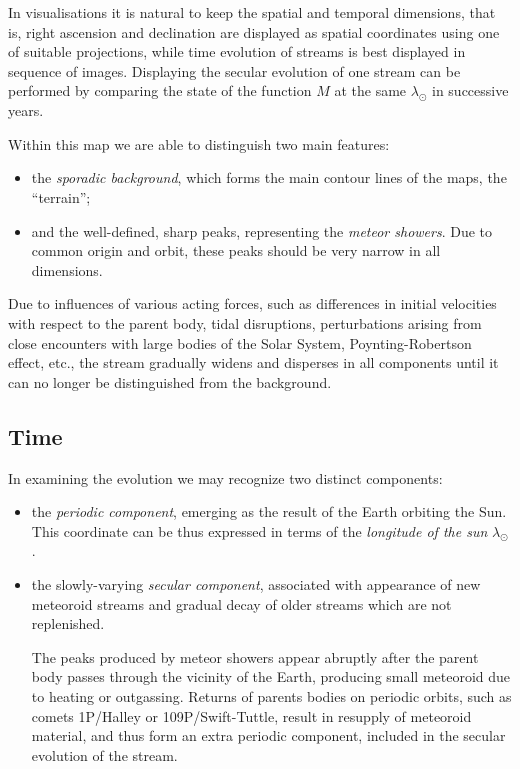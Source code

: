     In visualisations it is natural to keep the spatial and temporal dimensions, that is, right ascension and declination are
    displayed as spatial coordinates using one of suitable projections, while time evolution of streams is best displayed
    in sequence of images.
    Displaying the secular evolution of one stream can be performed by comparing the state of the function $M$ at
    the same $\lambda_\odot$ in successive years.

    \citep{balaz+2020}

    Within this map we are able to distinguish two main features:
    \begin{itemize}
        \item the \emph{sporadic background}, which forms the main contour lines of the maps, the ``terrain'';
        \item and the well-defined, sharp peaks, representing the \emph{meteor showers}. Due to common origin and orbit,
            these peaks should be very narrow in all dimensions.
    \end{itemize}

    Due to influences of various acting forces, such as differences
    in initial velocities with respect to the parent body, tidal disruptions,
    perturbations arising from close encounters with large bodies of the Solar System,
    Poynting-Robertson effect, etc., the stream
    gradually widens and disperses in all components until it can no longer be distinguished from the background.

    \subsection{Time} \label{i}
        In examining the evolution we may recognize two distinct components:
        \begin{itemize}
            \item the \emph{periodic component}, emerging as the result of the Earth orbiting the Sun.
                This coordinate can be thus expressed in terms of the \emph{longitude of the sun} $\lambda_\odot$.

            \item the slowly-varying \emph{secular component}, associated with appearance of new meteoroid streams and gradual decay of older
                streams which are not replenished.

                The peaks produced by meteor showers appear abruptly after the parent body passes through the vicinity of the Earth,
                producing small meteoroid due to heating or outgassing.
                Returns of parents bodies on periodic orbits, such as comets 1P/Halley or 109P/Swift-Tuttle, result
                in resupply of meteoroid material, and thus form an extra periodic component, included in the secular evolution of the stream.

        \end{itemize}
